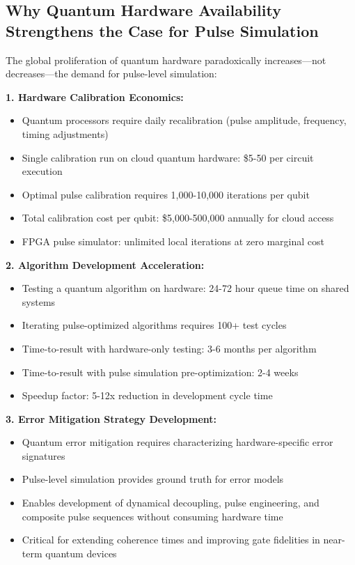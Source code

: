 \documentclass[12pt,a4paper]{article}
\begin{document}
\subsection{Why Quantum Hardware Availability Strengthens the Case for Pulse Simulation}

The global proliferation of quantum hardware paradoxically increases—not decreases—the demand for pulse-level simulation:

\textbf{1. Hardware Calibration Economics:}
\begin{itemize}[noitemsep]
\item Quantum processors require daily recalibration (pulse amplitude, frequency, timing adjustments)
\item Single calibration run on cloud quantum hardware: \$5-50 per circuit execution
\item Optimal pulse calibration requires 1,000-10,000 iterations per qubit
\item Total calibration cost per qubit: \$5,000-500,000 annually for cloud access
\item FPGA pulse simulator: unlimited local iterations at zero marginal cost
\end{itemize}

\textbf{2. Algorithm Development Acceleration:}
\begin{itemize}[noitemsep]
\item Testing a quantum algorithm on hardware: 24-72 hour queue time on shared systems
\item Iterating pulse-optimized algorithms requires 100+ test cycles
\item Time-to-result with hardware-only testing: 3-6 months per algorithm
\item Time-to-result with pulse simulation pre-optimization: 2-4 weeks
\item Speedup factor: 5-12x reduction in development cycle time
\end{itemize}

\textbf{3. Error Mitigation Strategy Development:}
\begin{itemize}[noitemsep]
\item Quantum error mitigation requires characterizing hardware-specific error signatures
\item Pulse-level simulation provides ground truth for error models
\item Enables development of dynamical decoupling, pulse engineering, and composite pulse sequences without consuming hardware time
\item Critical for extending coherence times and improving gate fidelities in near-term quantum devices
\end{itemize}
\end{document}
